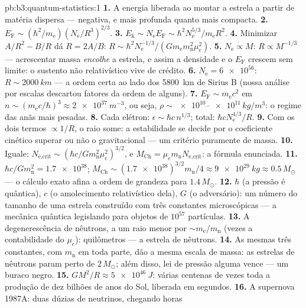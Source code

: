\begin{solution}{pb:b3:quantum-statistics:1}
\textbf{1.} A energia liberada ao montar a estrela a partir de matéria
dispersa --- negativa, e mais profunda quanto mais compacta.
\textbf{2.} $E_{\text{F}} \sim (\hbar^2/m_{\text{e}})
(N_{\text{e}}/R^3)^{2/3}$.
\textbf{3.} $E_{\text{k}} \sim N_{\text{e}}E_{\text{F}} \sim
\hbar^2N_{\text{e}}^{5/3}/m_{\text{e}}R^2$.
\textbf{4.} Minimizar $A/R^2 - B/R$ dá $R = 2A/B$: $R \sim
\hbar^2N_{\text{e}}^{-1/3}/(Gm_{\text{e}}m_{\text{n}}^2\mu_e^2)$.
\textbf{5.} $N_{\text{e}} \propto M$: $R \propto M^{-1/3}$ ---
acrescentar massa \emph{encolhe} a estrela, e assim a densidade e o
$E_{\text{F}}$ crescem sem limite: o sustento não relativístico vive
de crédito.
\textbf{6.} $N_{\text{e}} = \num{6e56}$: $R \sim \qty{2000}{km}$
--- a ordem certa ao lado dos \qty{5800}{km} de Sirius B (nossa análise
por escalas descartou fatores da ordem de alguns).
\textbf{7.} $E_{\text{F}} \sim m_{\text{e}}c^2$ em $n \sim
(m_{\text{e}}c/\hbar)^3 \approx \qty{2e37}{m^{-3}}$, ou seja, $\rho
\sim \num{e10}$--$\num{e11}\,\unit{kg/m^3}$: o regime das
anãs mais pesadas.
\textbf{8.} Cada elétron: $\epsilon \sim \hbar c\,n^{1/3}$;
total: $\hbar cN_{\text{e}}^{4/3}/R$.
\textbf{9.} Com os dois termos $\propto 1/R$, o raio some:
a estabilidade se decide por o coeficiente cinético superar ou não
o gravitacional --- um critério puramente de massa.
\textbf{10.} Iguale: $N_{\text{e,crit}} \sim (\hbar c/
Gm_{\text{n}}^2\mu_e^2)^{3/2}$, e $M_{\text{Ch}} =
\mu_em_{\text{n}}N_{\text{e,crit}}$: a fórmula enunciada.
\textbf{11.} $\hbar c/Gm_{\text{n}}^2 = \num{1.7e38}$;
$M_{\text{Ch}} \sim (\num{1.7e38})^{3/2}m_{\text{n}}/4 \approx
\qty{9e29}{kg} \approx 0.5\,M_\odot$ --- o cálculo exato
afina a ordem de grandeza para $1.4\,M_\odot$.
\textbf{12.} $\hbar$ (a pressão é quântica), $c$ (o
amolecimento relativístico dela), $G$ (o adversário): um número do
tamanho de uma estrela construído com três constantes microscópicas ---
a mecânica quântica legislando para objetos de $10^{57}$ partículas.
\textbf{13.} A degenerescência de nêutrons, a um raio menor por
$\sim m_{\text{e}}/m_{\text{n}}$ (vezes a contabilidade do $\mu_e$):
quilômetros --- a estrela de nêutrons.
\textbf{14.} As mesmas três constantes, com $m_{\text{n}}$ em toda
parte, dão a mesma escala de massa: as estrelas de nêutrons param perto
de $2\,M_\odot$; além disso, lei de pressão alguma vence --- um buraco negro.
\textbf{15.} $GM^2/R \approx \qty{5e46}{J}$: várias centenas de vezes
toda a produção de dez bilhões de anos do Sol, liberada em segundos.
\textbf{16.} A supernova 1987A: duas dúzias de neutrinos, chegando horas

\end{solution}
